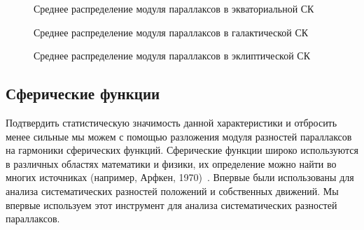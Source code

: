 \documentclass[14pt]{article} %
\begin{document}
\begin{figure}[h!]
\caption{Среднее распределение модуля параллаксов в экваториальной СК }
\label{img:sf_ra}
\end{figure}

\begin{figure}[h!]
\caption{Среднее распределение модуля параллаксов в галактической СК}
\label{img:sf_l}
\end{figure}

\begin{figure}[h!]
\caption{Среднее распределение модуля параллаксов в эклиптической СК}
\label{img:sf_lo}
\end{figure}


\subsection{Сферические функции}\label{sistem}  
Подтвердить статистическую значимость данной характеристики и отбросить менее сильные мы можем с помощью разложения модуля разностей параллаксов на гармоники сферических функций. Сферические функции широко используются в различных областях математики и физики, их определение можно найти во многих источниках (например, Арфкен, 1970)~\cite{book:arfken}. Впервые  были использованы для анализа систематических разностей положений и собственных движений. Мы впервые используем этот инструмент для анализа систематических разностей параллаксов.
 
\end{document}
